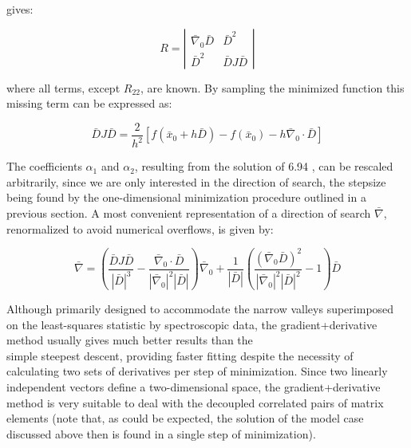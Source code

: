 \documentclass[10pt]{article}
\begin{document}
gives:

\[
R=\left|\begin{array}{cc}
\bar{\nabla}_{0} \bar{D} & \bar{D}^{2}  \tag{6.102}\\
\bar{D}^{2} & \bar{D} J \bar{D}
\end{array}\right|
\]

where all terms, except $R_{22}$, are known. By sampling the minimized function this missing term can be expressed as:


\begin{equation*}
\bar{D} J \bar{D}=\frac{2}{h^{2}}\left[f\left(\bar{x}_{0}+h \bar{D}\right)-f\left(\bar{x}_{0}\right)-h \bar{\nabla}_{0} \cdot \bar{D}\right] \tag{6.103}
\end{equation*}


The coefficients $\alpha_{1}$ and $\alpha_{2}$, resulting from the solution of 6.94 , can be rescaled arbitrarily, since we are only interested in the direction of search, the stepsize being found by the one-dimensional minimization procedure outlined in a previous section. A most convenient representation of a direction of search $\bar{\nabla}$, renormalized to avoid numerical overflows, is given by:


\begin{equation*}
\bar{\nabla}=\left(\frac{\bar{D} J \bar{D}}{|\bar{D}|^{3}}-\frac{\bar{\nabla}_{0} \cdot \bar{D}}{\left|\bar{\nabla}_{0}\right|^{2}|\bar{D}|}\right) \bar{\nabla}_{0}+\frac{1}{|\bar{D}|}\left(\frac{\left(\bar{\nabla}_{0} \bar{D}\right)^{2}}{\left|\bar{\nabla}_{0}\right|^{2}|\bar{D}|^{2}}-1\right) \bar{D} \tag{6.104}
\end{equation*}


Although primarily designed to accommodate the narrow valleys superimposed on the least-squares statistic by spectroscopic data, the gradient+derivative method usually gives much better results than the\\
simple steepest descent, providing faster fitting despite the necessity of calculating two sets of derivatives per step of minimization. Since two linearly independent vectors define a two-dimensional space, the gradient+derivative method is very suitable to deal with the decoupled correlated pairs of matrix elements (note that, as could be expected, the solution of the model case discussed above then is found in a single step of minimization).
\end{document}
